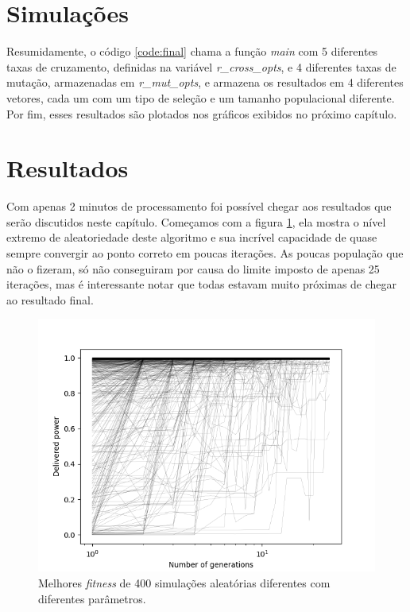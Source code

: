 \documentclass[12pt]{article}
\begin{document}
\section{Simulações}



Resumidamente, o código \ref{code:final} chama a função \textit{main} com 5 diferentes taxas de cruzamento, definidas na variável \textit{r\_cross\_opts}, e 4 diferentes taxas de mutação, armazenadas em \textit{r\_mut\_opts}, e armazena os resultados em 4 diferentes vetores, cada um com um tipo de seleção e um tamanho populacional diferente. Por fim, esses resultados são plotados nos gráficos exibidos no próximo capítulo.

\section{Resultados}

Com apenas 2 minutos de processamento foi possível chegar aos resultados que serão discutidos neste capítulo. Começamos com  a figura \ref{fig:fitgeral}, ela mostra o nível extremo de aleatoriedade deste algoritmo e sua incrível capacidade de quase sempre convergir ao ponto correto em poucas iterações. As poucas população que não o fizeram, só não conseguiram por causa do limite imposto de apenas 25 iterações, mas é interessante notar que todas estavam muito próximas de chegar ao resultado final.

\begin{figure}
    \centering
    \includegraphics{fig/generations.png}
    \caption{Melhores \textit{fitness} de 400 simulações aleatórias diferentes com diferentes parâmetros.}
    \label{fig:fitgeral}
\end{figure}
\end{document}
